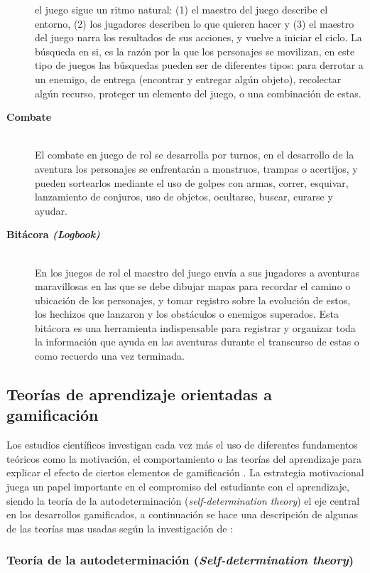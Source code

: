 \begin{description}
el juego sigue un ritmo natural: (1) el maestro del juego describe el entorno, (2) los jugadores describen lo
que quieren hacer y (3) el maestro del juego narra los resultados de sus acciones, y vuelve a iniciar el
ciclo. La búsqueda en si, es la razón por la que los personajes se movilizan, en este tipo de juegos las 
búsquedas pueden ser de diferentes tipos: para derrotar a un enemigo, de entrega (encontrar y entregar algún 
objeto), recolectar algún recurso, proteger un elemento del juego, o una combinación de estas.
\item[\textbf{Combate}] \hfill \\ El combate en juego de rol se desarrolla por turnos, en el desarrollo de la
aventura los personajes se enfrentarán a monstruos, trampas o acertijos, y pueden sortearlos mediante el uso
de golpes con armas, correr, esquivar, lanzamiento de conjuros, uso de objetos, ocultarse, buscar, curarse y 
ayudar.
\item[\textbf{Bitácora \textit{(Logbook)}}] \hfill \\ En los juegos de rol el maestro del juego envía a sus 
jugadores a aventuras maravillosas en las que se debe dibujar mapas para recordar el camino o ubicación de los 
personajes, y tomar registro sobre la evolución de estos, los hechizos que lanzaron y los obstáculos o 
enemigos superados. Esta bitácora es una herramienta indispensable para registrar y organizar toda la 
información que ayuda en las aventuras durante el transcurso de estas o como recuerdo una vez terminada.
\end{description}

\subsection{Teorías de aprendizaje orientadas a gamificación}

Los estudios científicos investigan cada vez más el uso de diferentes fundamentos teóricos como la motivación, 
el comportamiento o las teorías del aprendizaje para explicar el efecto de ciertos elementos de gamificación 
\cite{KRATH2021106963}. La estrategia motivacional juega un papel importante en el compromiso del estudiante 
con el aprendizaje, siendo la teoría de la autodeterminación (\textit{self-determination theory}) el eje 
central en los desarrollos gamificados, a continuación se hace una descripción de algunas de las teorías mas 
usadas según la investigación de :

\subsubsection{Teoría de la autodeterminación (\textit{Self-determination theory})}

